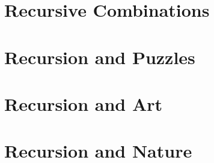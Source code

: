


\section{Recursive Combinations}



\section{Recursion and Puzzles}



\section{Recursion and Art}

\section{Recursion and Nature}
